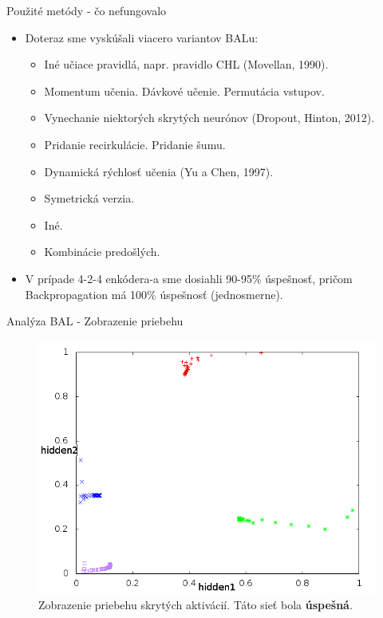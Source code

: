 \documentclass[xcolor=dvipsnames]{beamer}
\begin{document}
\begin{frame}{Použité metódy - čo nefungovalo}
  \begin{itemize}
    \item Doteraz sme vyskúšali viacero variantov BALu: 
    \begin{itemize} 
      \item Iné učiace pravidlá, napr. pravidlo CHL {\tiny (Movellan, 1990)}.
      \item Momentum učenia. Dávkové učenie. Permutácia vstupov. 
      \item Vynechanie niektorých skrytých neurónov {\tiny (Dropout, Hinton, 2012)}. 
      \item Pridanie recirkulácie. Pridanie šumu.
      \item Dynamická rýchlosť učenia {\tiny (Yu a Chen, 1997)}. 
      \item Symetrická verzia. 
      \item Iné.
      \item Kombinácie predošlých. 
    \end{itemize} 
    \item V prípade 4-2-4 enkódera-a sme dosiahli 90-95\% úspešnosť, pričom Backpropagation má 100\% úspešnosť (jednosmerne). 
  \end{itemize} 
\end{frame} 

\begin{frame}{Analýza BAL - Zobrazenie priebehu}
  \begin{figure}[h!]  
    \centering
    \includegraphics[scale=0.4]{img/nice.png}
    \caption{{\small Zobrazenie priebehu skrytých aktivácií. Táto sieť bola {\bf úspešná}.}} 
  \end{figure} 
\end{frame} 
\end{document}
